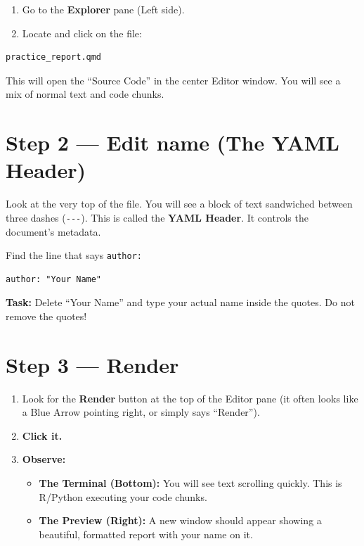 \documentclass[
  letterpaper,
  DIV=11,
  numbers=noendperiod,
  oneside]{scrreprt}
\providecommand{\tightlist}{%
  \setlength{\itemsep}{0pt}\setlength{\parskip}{0pt}}
\begin{document}
\begin{enumerate}
\def\labelenumi{\arabic{enumi}.}
\tightlist
\item
  Go to the \textbf{Explorer} pane (Left side).
\item
  Locate and click on the file:
\end{enumerate}

\begin{verbatim}
practice_report.qmd
\end{verbatim}

This will open the ``Source Code'' in the center Editor window. You will
see a mix of normal text and code chunks.

\section{Step 2 --- Edit name (The YAML
Header)}\label{step-2-edit-name-the-yaml-header}

Look at the very top of the file. You will see a block of text
sandwiched between three dashes (\texttt{-\/-\/-}). This is called the
\textbf{YAML Header}. It controls the document's metadata.

Find the line that says \texttt{author:}

\begin{verbatim}
author: "Your Name"
\end{verbatim}

\textbf{Task:} Delete ``Your Name'' and type your actual name inside the
quotes. Do not remove the quotes!

\section{Step 3 --- Render}\label{step-3-render}

\begin{enumerate}
\def\labelenumi{\arabic{enumi}.}
\tightlist
\item
  Look for the \textbf{Render} button at the top of the Editor pane (it
  often looks like a Blue Arrow pointing right, or simply says
  ``Render'').
\item
  \textbf{Click it.}
\item
  \textbf{Observe:}

  \begin{itemize}
  \tightlist
  \item
    \textbf{The Terminal (Bottom):} You will see text scrolling quickly.
    This is R/Python executing your code chunks.
  \item
    \textbf{The Preview (Right):} A new window should appear showing a
    beautiful, formatted report with your name on it.
  \end{itemize}
\end{enumerate}
\end{document}

